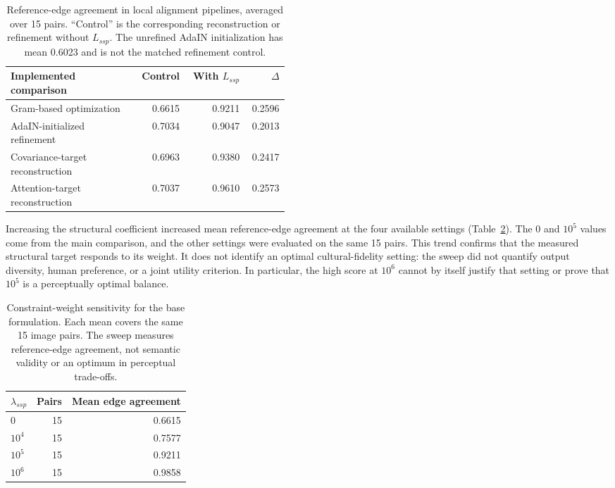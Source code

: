 \begin{table}[t]
\centering
\caption{Reference-edge agreement in local alignment pipelines, averaged over 15 pairs. ``Control'' is the corresponding reconstruction or refinement without $L_{ssp}$. The unrefined AdaIN initialization has mean 0.6023 and is not the matched refinement control.}
\label{tab:alignment}
\begin{tabular}{@{}p{0.46\linewidth}rrr@{}}
\toprule
Implemented comparison & Control & With $L_{ssp}$ & $\Delta$\\
\midrule
Gram-based optimization & 0.6615 & 0.9211 & 0.2596\\
AdaIN-initialized refinement & 0.7034 & 0.9047 & 0.2013\\
Covariance-target reconstruction & 0.6963 & 0.9380 & 0.2417\\
Attention-target reconstruction & 0.7037 & 0.9610 & 0.2573\\
\bottomrule
\end{tabular}
\end{table}

Increasing the structural coefficient increased mean reference-edge agreement at the four available settings (Table~\ref{tab:lambda}). The $0$ and $10^5$ values come from the main comparison, and the other settings were evaluated on the same 15 pairs. This trend confirms that the measured structural target responds to its weight. It does not identify an optimal cultural-fidelity setting: the sweep did not quantify output diversity, human preference, or a joint utility criterion. In particular, the high score at $10^6$ cannot by itself justify that setting or prove that $10^5$ is a perceptually optimal balance.

\begin{table}[t]
\centering
\caption{Constraint-weight sensitivity for the base formulation. Each mean covers the same 15 image pairs. The sweep measures reference-edge agreement, not semantic validity or an optimum in perceptual trade-offs.}
\label{tab:lambda}
\begin{tabular}{@{}lrr@{}}
\toprule
$\lambda_{ssp}$ & Pairs & Mean edge agreement\\
\midrule
$0$ & 15 & 0.6615\\
$10^4$ & 15 & 0.7577\\
$10^5$ & 15 & 0.9211\\
$10^6$ & 15 & 0.9858\\
\bottomrule
\end{tabular}
\end{table}

